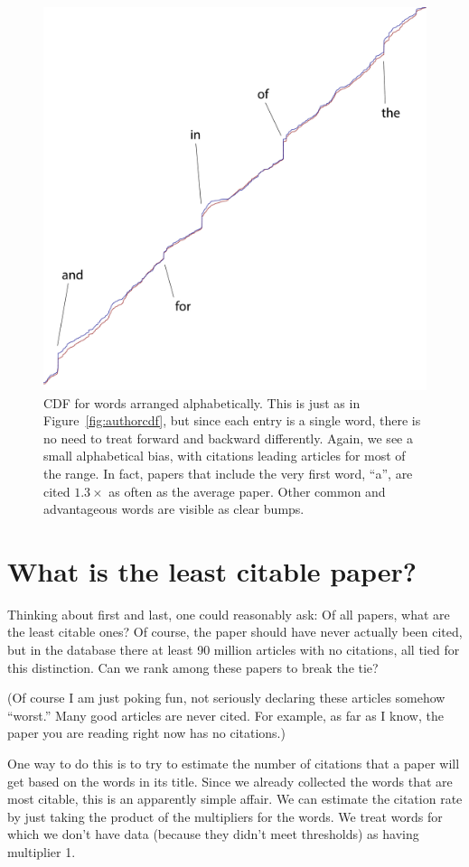 \documentclass[twocolumn]{article}
\begin{document}
\begin{figure}
  \begin{center}
  \includegraphics[width=0.475 \textwidth]{wordstats}
  \end{center}
  \caption{ CDF for words arranged alphabetically. This is just as
    in Figure~\ref{fig:authorcdf}, but since each entry is a single
    word, there is no need to treat forward and backward differently.
    Again, we see a small alphabetical bias, with citations leading
    articles for most of the range. In fact, papers that include the
    very first word, ``a'', are cited $1.3\times$ as often as the
    average paper. Other common and advantageous words are visible
    as clear bumps.
  } \label{fig:wordcdf}
\end{figure}

\section{What is the least citable paper?}

Thinking about first and last, one could reasonably ask: Of all
papers, what are the least citable ones? Of course, the paper should
have never actually been cited, but in the database there at least 90
million articles with no citations, all tied for this distinction. Can
we rank among these papers to break the tie?

(Of course I am just poking fun, not seriously declaring these
articles somehow ``worst.'' Many good articles are never cited. For
example, as far as I know, the paper you are reading right now has no
citations.)

One way to do this is to try to estimate the number of citations that
a paper will get based on the words in its title. Since we already
collected the words that are most citable, this is an apparently
simple affair. We can estimate the citation rate by just taking the
product of the multipliers for the words. We treat words for which
we don't have data (because they didn't meet thresholds) as having
multiplier 1.
\end{document}
